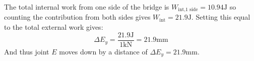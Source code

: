 \documentclass{article}
\begin{document}
The total internal work from one side of the bridge is $W_\text{int,1 side}=10.94\si{\joule}$ so counting the contribution from both sides gives $W_\text{int}=21.9\si{\joule}$. Setting this equal to the total external work gives:
\begin{equation}
    \Delta E_y = \frac{21.9\si{\joule}}{1\si{\kilo\newton}} = 21.9\si{\milli\meter}
    \label{eq:}
\end{equation}
And thus joint $E$ moves down by a distance of $\boxed{\Delta E_y=21.9\si{\milli\meter}}$.
\end{document}
